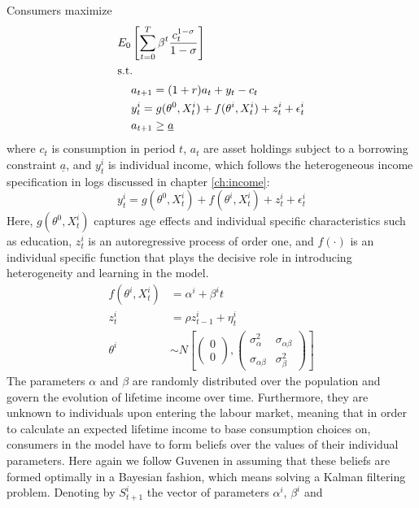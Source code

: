 Consumers maximize
\begin{align}
E_0 &\left[ \sum_{t=0}^{T} \beta^{t} \frac{c_{t}^{1-\sigma}}{1-\sigma} \right] \label{eq:maxprob} \\
\intertext{s.t. } &a_{t+1} = (1+r)a_t + y_t - c_t \label{eq:bc} \\
				  &y_{t}^i = g(\theta^0, X_t^i) + f(\theta^i, X_t^i) + z_t^i + \epsilon_t^i \label{eq:incproc} \\
  				  &a_{t+1} \geq \underline{a} \label{eq:borrcons} 
\end{align}
where $c_t$ is consumption in period $t$, $a_t$ are asset holdings subject to 
a borrowing constraint  $\underline{a}$, and $y_t^i$ is individual 
income, which follows the heterogeneous income specification in logs discussed
in chapter \ref{ch:income}: 
\begin{equation*}
y_{t}^i = g(\theta^0, X_t^i) + f(\theta^i, X_t^i) + z_t^i + \epsilon_t^i 
\end{equation*}
Here, $g(\theta^0, X_t^i)$ captures age effects and individual specific 
characteristics such as education, $z_t^i$ is an autoregressive process of order
 one, and $f(\cdot)$ is an individual specific function that plays the decisive
role in introducing heterogeneity and learning in the model.
\begin{align*}
f(\theta^i, X_t^i) &= \alpha^i + \beta^i t \\
z_t^i &= \rho z_{t-1}^i + \eta_t^i \\
\theta^i &\sim N \left[ \begin{pmatrix} 0 \\ 0 \end{pmatrix}, \begin{pmatrix} \sigma_{\alpha}^2 & \sigma_{\alpha \beta} \\ \sigma_{\alpha \beta} & \sigma_{\beta}^2 \end{pmatrix} \right]
\end{align*}
The parameters $\alpha$ and $\beta$ are randomly distributed over the population 
and govern the evolution of lifetime income over time. Furthermore, they are 
unknown to individuals upon entering the labour market, meaning that in order to
 calculate an expected lifetime income to base consumption choices on, consumers 
in the model have to form beliefs over the values of their individual parameters. 
Here again we follow Guvenen in assuming that these beliefs are formed optimally
in a Bayesian fashion, which means solving a Kalman filtering problem. 
Denoting by $S^i_{t+1}$ the vector of parameters $\alpha^i$, $\beta^i$ and 
